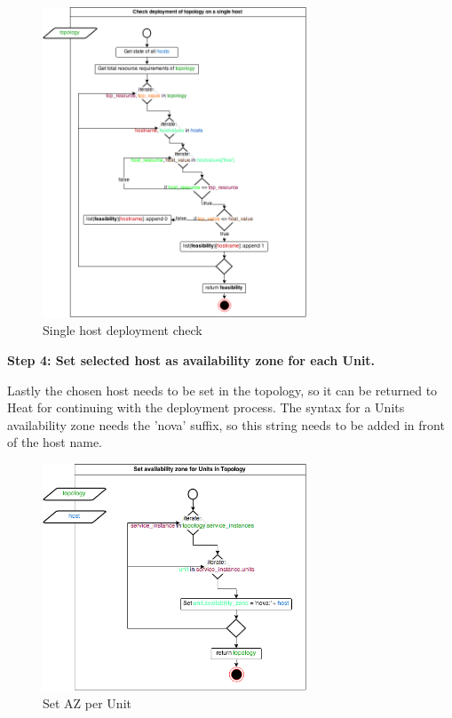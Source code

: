 \begin{figure}[H]
\centering

\includegraphics[width=0.7\textwidth]{images/design/cm_single_host_check}

\caption{Single host deployment check}
\end{figure}


\textbf{Step 4: Set selected host as availability zone for each Unit.}

Lastly the chosen host needs to be set in the topology, so it can be returned to Heat for continuing with the deployment process. The syntax for a Units availability zone needs the 'nova' suffix, so this string needs to be added in front of the host name.

\begin{figure}[H]
\centering

\includegraphics[width=0.7\textwidth]{images/design/cm_set_az_topology}

\caption{Set AZ per Unit}
\end{figure}


